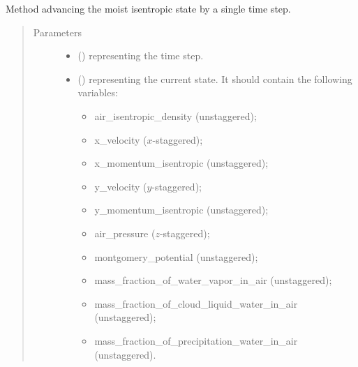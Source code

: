 \documentclass[letterpaper,10pt,english]{sphinxmanual}
\begin{document}
\begin{fulllineitems}
\begin{fulllineitems}
\label{\detokenize{api:dycore.dycore_isentropic.DynamicalCoreIsentropic._carry_out_large_timestep_moist}}
Method advancing the moist isentropic state by a single time step.
\begin{quote}\begin{description}
\item[{Parameters}] \leavevmode\begin{itemize}
\item {} 
 () \textendash{}  representing the time step.

\item {} 
 () \textendash{} 
{\hyperref[\detokenize{api:storages.state_isentropic.StateIsentropic}]{}} representing the current state.
It should contain the following variables:
\begin{itemize}
\item {} 
air\_isentropic\_density (unstaggered);

\item {} 
x\_velocity (\(x\)-staggered);

\item {} 
x\_momentum\_isentropic (unstaggered);

\item {} 
y\_velocity (\(y\)-staggered);

\item {} 
y\_momentum\_isentropic (unstaggered);

\item {} 
air\_pressure (\(z\)-staggered);

\item {} 
montgomery\_potential (unstaggered);

\item {} 
mass\_fraction\_of\_water\_vapor\_in\_air (unstaggered);

\item {} 
mass\_fraction\_of\_cloud\_liquid\_water\_in\_air (unstaggered);

\item {} 
mass\_fraction\_of\_precipitation\_water\_in\_air (unstaggered).

\end{itemize}



\end{itemize}
\end{description}
\end{quote}
\end{fulllineitems}
\end{fulllineitems}
\end{document}
